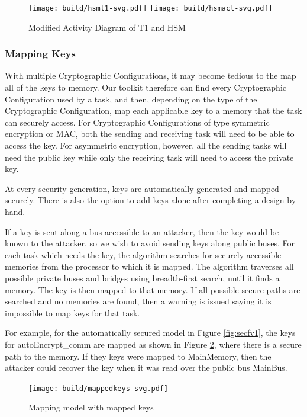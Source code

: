 \documentclass[12pt]{article}
\begin{document}
\begin{figure}[htbp]
\centering
\texttt{[image: build/hsmt1-svg.pdf]}
\texttt{[image: build/hsmact-svg.pdf]}
\caption{Modified Activity Diagram of T1 and HSM} \label{fig:hsmt1act}
\end{figure}




\subsubsection{Mapping Keys}

With multiple Cryptographic Configurations, it may become tedious to the map all of the keys to memory. Our toolkit therefore can find every Cryptographic Configuration used by a task, and then, depending on the type of the Cryptographic Configuration, map each applicable key to a memory that the task can securely access. For Cryptographic Configurations of type symmetric encryption or MAC, both the sending and receiving task will need to be able to access the key. For asymmetric encryption, however, all the sending tasks will need the public key while only the receiving task will need to access the private key. 

At every security generation, keys are automatically generated and mapped securely. There is also the option to add keys alone after completing a design by hand.

If a key is sent along a bus accessible to an attacker, then the key would be known to the attacker, so we wish to avoid sending keys along public buses. For each task which needs the key, the algorithm searches for securely accessible memories from the processor to which it is mapped. The algorithm traverses all possible private buses and bridges using breadth-first search, until it finds a memory. The key is then mapped to that memory. If all possible secure paths are searched and no memories are found, then a warning is issued saying it is impossible to map keys for that task.

For example, for the automatically secured model in Figure \ref{fig:secfv1}, the keys for autoEncrypt\_comm are mapped as shown in Figure \ref{fig:mapkey}, where there is a secure path to the memory. If they keys were mapped to MainMemory, then the attacker could recover the key when it was read over the public bus MainBus. 

\begin{figure}[htbp]
\centering
\texttt{[image: build/mappedkeys-svg.pdf]}
\caption{Mapping model with mapped keys} \label{fig:mapkey}
\end{figure}
\end{document}
